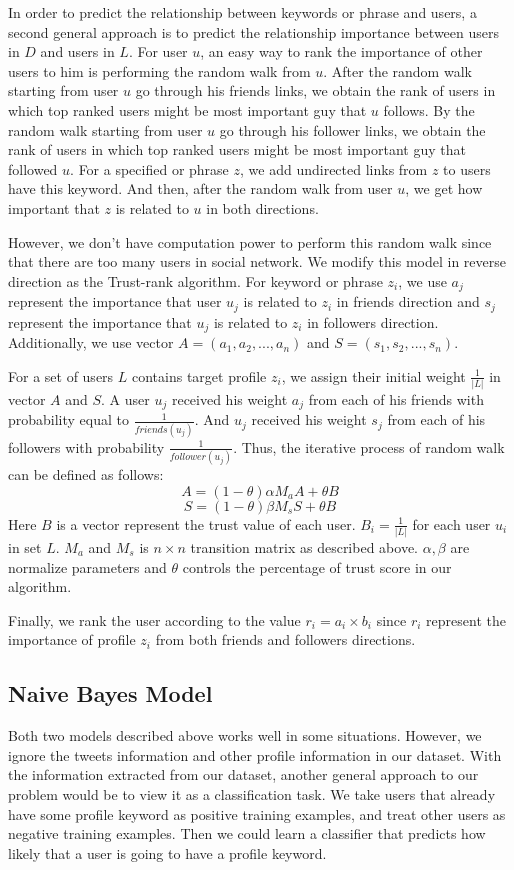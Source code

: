 \documentclass{article}
\begin{document}
In order to predict the relationship between keywords or phrase and users, a second general approach is to predict the relationship importance between users in $D$ and users in $L$. For user $u$, an easy way to rank the importance of other users to him is performing the random walk from $u$. After the random walk starting from user $u$ go through his friends links, we obtain the rank of users in which top ranked users might be most important guy that $u$ follows. By the random walk starting from user $u$ go through his follower links, we obtain the rank of users in which top ranked users might be most important guy that followed $u$. For a specified or phrase $z$, we add undirected links from $z$ to users have this keyword. And then, after the random walk from user $u$, we get how important that $z$ is related to $u$ in both directions.

However, we don't have computation power to perform this random walk since that there are too many users in social network. We modify this model in reverse direction as the Trust-rank algorithm. For keyword or phrase $z_i$, we use $a_j$ represent the importance that user $u_j$ is related to $z_i$ in friends direction and $s_j$ represent the importance that $u_j$ is related to $z_i$ in followers direction. Additionally, we use vector $A=(a_1, a_2, ..., a_n)$ and $S=(s_1, s_2, ..., s_n)$.

For a set of users $L$ contains target profile $z_i$, we assign their initial weight $\frac{1}{|L|}$ in vector $A$ and $S$. A user $u_j$ received his weight $a_j$ from each of his friends with probability equal to $\frac{1}{friends(u_j)}$. And $u_j$ received his weight $s_j$ from each of his followers with probability $\frac{1}{follower(u_j)}$. Thus, the iterative process of random walk can be defined as follows:
$$A = (1 - \theta)\alpha M_a A + \theta B$$
$$S = (1 - \theta)\beta M_s S + \theta B$$
Here $B$ is a vector represent the trust value of each user. $B_i = \frac{1}{|L|}$ for each user $u_i$ in set $L$. $M_a$ and $M_s$ is $n \times n$ transition matrix as described above. $\alpha, \beta$ are normalize parameters and $\theta$ controls the percentage of trust score in our algorithm.

Finally, we rank the user according to the value $r_i=a_i \times b_i$ since $r_i$ represent the importance of profile $z_i$ from both friends and followers directions.

\subsection{Naive Bayes Model}
Both two models described above works well in some situations. However, we ignore the tweets information and other profile information in our dataset. With the information extracted from our dataset, another general approach to our problem would be to view it as a classification task. We take users that already have some profile keyword as positive training examples, and treat other users as negative training examples. Then we could learn a classifier that predicts how likely that a user is going to have a profile keyword.
\end{document}
